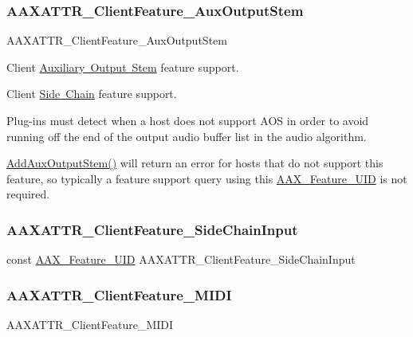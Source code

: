 \subsubsection{\texorpdfstring{AAXATTR\_ClientFeature\_AuxOutputStem}{AAXATTR\_ClientFeature\_AuxOutputStem}}
{\footnotesize\ttfamily A\+A\+X\+A\+T\+T\+R\+\_\+\+Client\+Feature\+\_\+\+Aux\+Output\+Stem}



Client \mbox{\hyperlink{a00809}{Auxiliary Output Stem}} feature support. 

Client \mbox{\hyperlink{a00808}{Side Chain}} feature support.

Plug-\/ins must detect when a host does not support A\+OS in order to avoid running off the end of the output audio buffer list in the audio algorithm.

\mbox{\hyperlink{a01781_a76266e8a07ce20cdbe5721172c32a93d}{Add\+Aux\+Output\+Stem()}} will return an error for hosts that do not support this feature, so typically a feature support query using this \mbox{\hyperlink{a00683_a53d6cf8a08224b3e813333e411ce798e}{A\+A\+X\+\_\+\+Feature\+\_\+\+U\+ID}} is not required. \mbox{\label{a00683_ad130c555cc62e4fbc5c8101d8d10ae45}} 
\subsubsection{\texorpdfstring{AAXATTR\_ClientFeature\_SideChainInput}{AAXATTR\_ClientFeature\_SideChainInput}}
{\footnotesize\ttfamily const \mbox{\hyperlink{a00392_a53d6cf8a08224b3e813333e411ce798e}{A\+A\+X\+\_\+\+Feature\+\_\+\+U\+ID}} A\+A\+X\+A\+T\+T\+R\+\_\+\+Client\+Feature\+\_\+\+Side\+Chain\+Input}

\mbox{\label{a00683_ab018f9c736d0ffd41f1f67e77fa96773}} 
\subsubsection{\texorpdfstring{AAXATTR\_ClientFeature\_MIDI}{AAXATTR\_ClientFeature\_MIDI}}
{\footnotesize\ttfamily A\+A\+X\+A\+T\+T\+R\+\_\+\+Client\+Feature\+\_\+\+M\+I\+DI}



